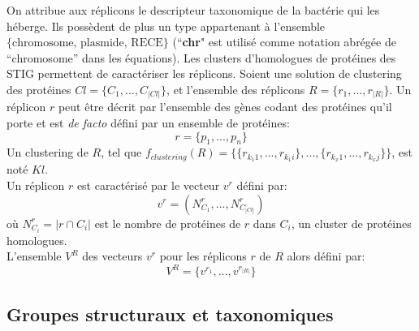 On attribue aux réplicons le descripteur taxonomique de la bactérie qui les héberge. Ils possèdent de plus un type appartenant à l'ensemble $\{ \text{chromosome, plasmide, RECE} \} $ (``\textbf{chr}" est utilisé comme notation abrégée de “chromosome” dans les équations).
Les clusters d’homologues de protéines des STIG permettent de caractériser les réplicons. Soient une solution de clustering des protéines $Cl=\{C_{1},...,C_{|Cl|}\}$, et l'ensemble des réplicons $R=\{r_{1},...,r_{|R|}\}$. Un réplicon $r$ peut être décrit par l'ensemble des gènes codant des protéines qu'il porte et est  \textit{de facto} défini par un ensemble de protéines:
	\begin{equation}
	r=\{p_{1},...,p_{n}\}
	 \end{equation}
 Un clustering de $R$, tel que $f_{clustering}(R)=\Big\{\{r_{k_{1}1},...,r_{k_{1}i}\},...,\{r_{k_{x}1},...,r_{k_{x}j}\}\Big\}$, est noté $Kl$.\\
 Un réplicon $r$ est caractérisé par le vecteur $v^{r}$ défini par:
  	\begin{equation}\label{eqvr}
  	v^{r}=(N^{r}_{C_{1}},...,N^{r}_{C_{|Cl|}})
	\end{equation}
	où  $N^{r}_{C_{i}}=|r \cap C_{i}|$ est le nombre de protéines de $r$ dans $C_{i}$, un cluster de protéines homologues.\\	
L'ensemble $V^{R}$ des vecteurs $v^{r}$ pour les réplicons $r$ de $R$  alors défini par:
	\begin{equation}\label{eqV}
	V^{R}=\{v^{r_{1}},...,v^{r_{|R|}}\}
        \end{equation}		

\subsection{Groupes structuraux et taxonomiques}

